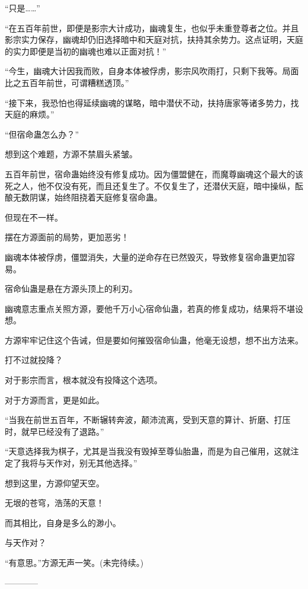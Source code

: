 \begin{this_body}
“只是……”

“在五百年前世，即便是影宗大计成功，幽魂复生，也似乎未重登尊者之位。并且影宗实力保存，幽魂却仍旧选择暗中和天庭对抗，扶持其余势力。这点证明，天庭的实力即便是当初的幽魂也难以正面对抗！”

“今生，幽魂大计因我而败，自身本体被俘虏，影宗风吹雨打，只剩下我等。局面比之五百年前世，可谓糟糕透顶。”

“接下来，我恐怕也得延续幽魂的谋略，暗中潜伏不动，扶持唐家等诸多势力，找天庭的麻烦。”

“但宿命蛊怎么办？”

想到这个难题，方源不禁眉头紧皱。

五百年前世，宿命蛊始终没有修复成功。因为僵盟健在，而魔尊幽魂这个最大的该死之人，他不仅没有死，而且还复生了。不仅复生了，还潜伏天庭，暗中操纵，酝酿无数阴谋，始终阻挠着天庭修复宿命蛊。

但现在不一样。

摆在方源面前的局势，更加恶劣！

幽魂本体被俘虏，僵盟消失，大量的逆命存在已然毁灭，导致修复宿命蛊更加容易。

宿命仙蛊是悬在方源头顶上的利刃。

幽魂意志重点关照方源，要他千万小心宿命仙蛊，若真的修复成功，结果将不堪设想。

方源牢牢记住这个告诫，但是要如何摧毁宿命仙蛊，他毫无设想，想不出方法来。

打不过就投降？

对于影宗而言，根本就没有投降这个选项。

对于方源而言，更是如此。

“当我在前世五百年，不断辗转奔波，颠沛流离，受到天意的算计、折磨、打压时，就早已经没有了退路。”

“天意选择我为棋子，尤其是当我没有毁掉至尊仙胎蛊，而是为自己催用，这就注定了我将与天作对，别无其他选择。”

想到这里，方源仰望天空。

无垠的苍穹，浩荡的天意！

而其相比，自身是多么的渺小。

与天作对？

“有意思。”方源无声一笑。(未完待续。)

------------

\end{this_body}

